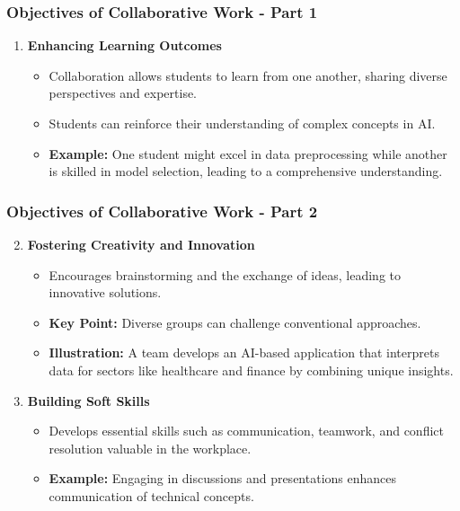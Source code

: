 \documentclass{beamer}
\begin{document}
\begin{frame}[fragile]
    \frametitle{Objectives of Collaborative Work - Part 1}
    \begin{enumerate}
        \item \textbf{Enhancing Learning Outcomes}
            \begin{itemize}
                \item Collaboration allows students to learn from one another, sharing diverse perspectives and expertise.
                \item Students can reinforce their understanding of complex concepts in AI.
                \item \textbf{Example:} One student might excel in data preprocessing while another is skilled in model selection, leading to a comprehensive understanding.
            \end{itemize}
    \end{enumerate}
\end{frame}

\begin{frame}[fragile]
    \frametitle{Objectives of Collaborative Work - Part 2}
    \begin{enumerate}
        \setcounter{enumi}{1} %
        \item \textbf{Fostering Creativity and Innovation}
            \begin{itemize}
                \item Encourages brainstorming and the exchange of ideas, leading to innovative solutions.
                \item \textbf{Key Point:} Diverse groups can challenge conventional approaches.
                \item \textbf{Illustration:} A team develops an AI-based application that interprets data for sectors like healthcare and finance by combining unique insights.
            \end{itemize}
            
        \item \textbf{Building Soft Skills}
            \begin{itemize}
                \item Develops essential skills such as communication, teamwork, and conflict resolution valuable in the workplace.
                \item \textbf{Example:} Engaging in discussions and presentations enhances communication of technical concepts.
            \end{itemize}
    \end{enumerate}
\end{frame}
\end{document}
